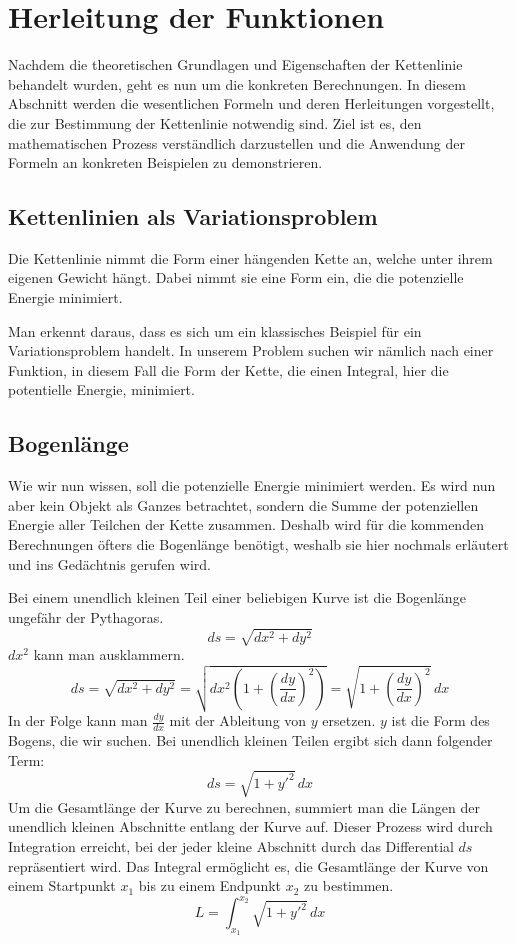 %
%
%
%
\section{Herleitung der Funktionen\label{kettenlinie:section:Herleitung der Funktionen}}
Nachdem die theoretischen Grundlagen und Eigenschaften der Kettenlinie behandelt wurden, geht es nun um die konkreten Berechnungen.
In diesem Abschnitt werden die wesentlichen Formeln und deren Herleitungen vorgestellt, die zur Bestimmung der Kettenlinie notwendig sind.
Ziel ist es, den mathematischen Prozess verständlich darzustellen und die Anwendung der Formeln an konkreten Beispielen zu demonstrieren.

\subsection{Kettenlinien als Variationsproblem
\label{kettenlinie:subsection:Kettenlinien als Variationsproblem}}
Die Kettenlinie nimmt die Form einer hängenden Kette an, welche unter ihrem eigenen Gewicht hängt.
Dabei nimmt sie eine Form ein, die die potenzielle Energie minimiert.

Man erkennt daraus, dass es sich um ein klassisches Beispiel für ein Variationsproblem handelt.
In unserem Problem suchen wir nämlich nach einer Funktion, in diesem Fall die Form der Kette, die einen Integral, hier die potentielle Energie, minimiert.

\subsection{Bogenlänge
\label{kettenlinie:subsection:Bogenlänge}}
Wie wir nun wissen, soll die potenzielle Energie minimiert werden.
Es wird nun aber kein Objekt als Ganzes betrachtet, sondern die Summe der potenziellen Energie aller Teilchen der Kette zusammen.
Deshalb wird für die kommenden Berechnungen öfters die Bogenlänge benötigt, weshalb sie hier nochmals erläutert und ins Gedächtnis gerufen wird.

Bei einem unendlich kleinen Teil einer beliebigen Kurve ist die Bogenlänge ungefähr der Pythagoras.
\[
	ds
	=
	\sqrt{dx^2 + dy^2}
	\label{kettenlinie:equation1}
\]
\(dx^2\) kann man ausklammern.
\[
	ds
	=
	\sqrt{dx^2 + dy^2}
	=
	\sqrt{dx^2 \left( 1 + \left( \frac{dy}{dx} \right)^2 \right)}
	=
	\sqrt{1 + \left( \frac{dy}{dx} \right)^2} \, dx
\]
In der Folge kann man \(\frac{dy}{dx}\) mit der Ableitung von \(y\) ersetzen.
\(y\) ist die Form des Bogens, die wir suchen.
Bei unendlich kleinen Teilen ergibt sich dann folgender Term:
\[
	ds
	=
	\sqrt{1 + y'^2} \, dx
\]
Um die Gesamtlänge der Kurve zu berechnen, summiert man die Längen der unendlich kleinen Abschnitte entlang der Kurve auf.
Dieser Prozess wird durch Integration erreicht, bei der jeder kleine Abschnitt durch das Differential \(ds\) repräsentiert wird.
Das Integral ermöglicht es, die Gesamtlänge der Kurve von einem Startpunkt \(x_1\) bis zu einem Endpunkt \(x_2\) zu bestimmen.
\[
	L
	=
	\int_{x_1}^{x_2} \sqrt{1 + y'^2} \, dx
\]

